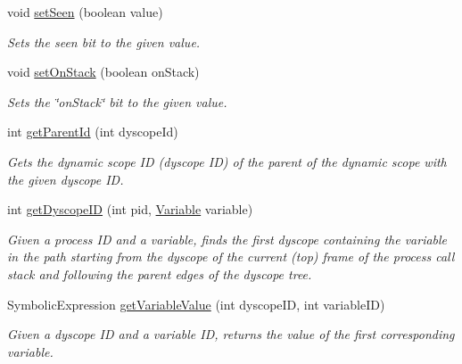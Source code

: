 \begin{DoxyCompactItemize}
void \hyperlink{classedu_1_1udel_1_1cis_1_1vsl_1_1civl_1_1state_1_1common_1_1immutable_1_1ImmutableMonoState_af198e587242e465f4c7eb6e529424112}{set\+Seen} (boolean value)
\begin{DoxyCompactList}\small\item\em Sets the seen bit to the given value. \end{DoxyCompactList}\item 
void \hyperlink{classedu_1_1udel_1_1cis_1_1vsl_1_1civl_1_1state_1_1common_1_1immutable_1_1ImmutableMonoState_abcbd2d81aa0e7490632a3e47f267013e}{set\+On\+Stack} (boolean on\+Stack)
\begin{DoxyCompactList}\small\item\em Sets the \char`\"{}on\+Stack\char`\"{} bit to the given value. \end{DoxyCompactList}\item 
int \hyperlink{classedu_1_1udel_1_1cis_1_1vsl_1_1civl_1_1state_1_1common_1_1immutable_1_1ImmutableMonoState_a68991670a5d0f69b9ad7c578660f73b2}{get\+Parent\+Id} (int dyscope\+Id)
\begin{DoxyCompactList}\small\item\em Gets the dynamic scope I\+D (dyscope I\+D) of the parent of the dynamic scope with the given dyscope I\+D. \end{DoxyCompactList}\item 
int \hyperlink{classedu_1_1udel_1_1cis_1_1vsl_1_1civl_1_1state_1_1common_1_1immutable_1_1ImmutableMonoState_aedc5c11f6fa66871ce28c303b745a6ac}{get\+Dyscope\+I\+D} (int pid, \hyperlink{interfaceedu_1_1udel_1_1cis_1_1vsl_1_1civl_1_1model_1_1IF_1_1variable_1_1Variable}{Variable} variable)
\begin{DoxyCompactList}\small\item\em Given a process I\+D and a variable, finds the first dyscope containing the variable in the path starting from the dyscope of the current (top) frame of the process call stack and following the parent edges of the dyscope tree. \end{DoxyCompactList}\item 
Symbolic\+Expression \hyperlink{classedu_1_1udel_1_1cis_1_1vsl_1_1civl_1_1state_1_1common_1_1immutable_1_1ImmutableMonoState_a3df06b9188b54abb1d661933492658bc}{get\+Variable\+Value} (int dyscope\+I\+D, int variable\+I\+D)
\begin{DoxyCompactList}\small\item\em Given a dyscope I\+D and a variable I\+D, returns the value of the first corresponding variable. \end{DoxyCompactList}\item 

\end{DoxyCompactItemize}
